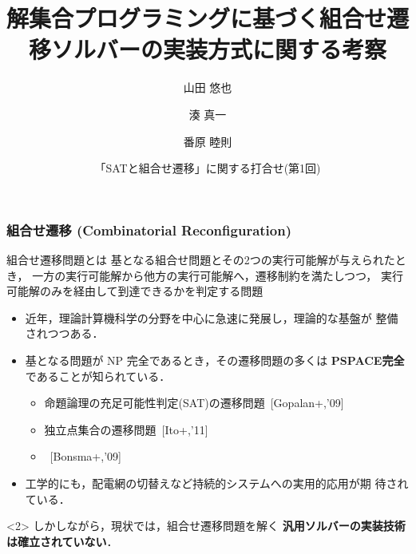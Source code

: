 \documentclass[dvipdfmx,11pt]{beamer}
\title{解集合プログラミングに基づく組合せ遷移ソルバーの実装方式に関する考察}
\author{山田 悠也\inst{1} \and 湊 真一\inst{2} \and 番原 睦則\inst{1}}
\date{「SATと組合せ遷移」に関する打合せ(第1回)}
\institute{\inst{1}名古屋大学 大学院情報学研究科 \and \inst{2}京都大学 大学院情報学研究科}
\begin{document}
\maketitle
\begin{frame}
  \frametitle{組合せ遷移 (Combinatorial Reconfiguration)}
  \begin{alertblock}{組合せ遷移問題とは}
    基となる組合せ問題とその2つの実行可能解が与えられたとき，
    一方の実行可能解から他方の実行可能解へ，遷移制約を満たしつつ，
    実行可能解のみを経由して到達できるかを判定する問題
  \end{alertblock}

  \begin{itemize}
  \item 近年，理論計算機科学の分野を中心に急速に発展し，理論的な基盤が
    整備されつつある\footnotemark[1]．
  \item 基となる問題が NP 完全であるとき，その遷移問題の多くは
    \alert{\bf PSPACE完全}であることが知られている．
    \begin{itemize}
    \item 命題論理の充足可能性判定(SAT)の遷移問題~[Gopalan+,'09]
    \item 独立点集合の遷移問題~[Ito+,'11]
    \item {}~[Bonsma+,'09]
    \end{itemize}
  \item 工学的にも，配電網の切替えなど持続的システムへの実用的応用が期
    待されている．
  \end{itemize}

  \begin{alertblock}<2>{}\centering
    しかしながら，現状では，組合せ遷移問題を解く
    \alert{\bf 汎用ソルバーの実装技術は確立されていない}．
  \end{alertblock}

\end{frame}
\end{document}
